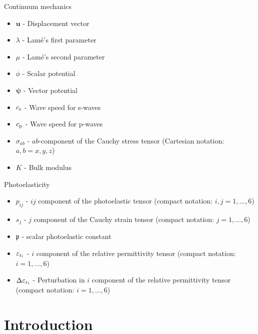 \documentclass[11pt,twoside]{eitExjobb}
\begin{document}
		Continuum mechanics
		\begin{itemize}
			\item $\bm{u}$ - Displacement vector
			\item $\lambda$ - Lamé's first parameter
			\item $\mu$ - Lamé's second parameter
			\item $\phi$ - Scalar potential
			\item $\bm{\psi}$ - Vector potential
			\item $c_{\mathrm{s}}$ - Wave speed for s-waves
			\item $c_{\mathrm{p}}$ - Wave speed for p-waves
			\item $\sigma_{ab}$ - $ab$-component of the Cauchy stress tensor (Cartesian notation: $a,b = x,y,z$)
			\item $K$ - Bulk modulus
		\end{itemize}
		Photoelasticity
		\begin{itemize}
			\item $p_{ij}$ - $ij$ component of the photoelastic tensor (compact notation: $i,j = 1,\dotsc,6$)
			\item $s_j$ - $j$ component of the Cauchy strain tensor (compact notation: $j = 1,\dotsc,6$)
			\item $\mathfrak{p}$ - scalar photoelastic constant
			\item $\varepsilon_{\mathrm{r}_i}$ - $i$ component of the relative permittivity tensor (compact notation: $i = 1,\dotsc,6$)
			\item $\Delta \varepsilon_{\mathrm{r}_i}$ - Perturbation in $i$ component of the relative permittivity tensor (compact notation: $i = 1,\dotsc,6$)
		\end{itemize}
	
	\cleardoublepage
	
	\mainmatter		%
	
	\chapter{Introduction \label{ch:intro}}
	
\end{document}
